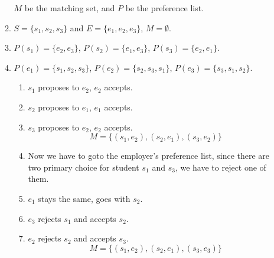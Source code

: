 \documentclass[12pt]{article}
\begin{document}
\begin{enumerate}
\begin{enumerate}
                 $M$ be the matching set, and $P$ be the preference list.
                \item $S = \{s_1, s_2, s_3\}$ and $E = \{e_1, e_2, e_3\}$, $M = \emptyset$.
                \item $P(s_1) = \{e_2, e_3\}$, $P(s_2) = \{e_1, e_3\}$, $P(s_3) = \{e_2, e_1\}$.
                \item $P(e_1) = \{s_1, s_2, s_3\}$, $P(e_2) = \{s_2, s_3, s_1\}$, $P(e_3) = \{s_3, s_1, s_2\}$.
                \begin{enumerate}
                    \item $s_1$ proposes to $e_2$, $e_2$ accepts.
                    \item $s_2$ proposes to $e_1$, $e_1$ accepts.
                    \item $s_3$ proposes to $e_2$, $e_2$ accepts.
                    \[ M = \{(s_1, e_2), (s_2, e_1), (s_3, e_2)\} \]
                    \item Now we have to goto the employer's preference list, since there are two
                    primary choice for student $s_1$ and $s_3$, we have to reject one of them.
                    \item $e_1$ stays the same, goes with $s_2$.
                    \item $e_3$ rejects $s_1$ and accepts $s_2$.
                    \item $e_2$ rejects $s_2$ and accepts $s_3$.
                    \[ M = \{(s_1, e_2), (s_2, e_1), (s_3, e_3)\} \]
                \end{enumerate}
            \end{enumerate}
            
    \end{enumerate}
\end{document}
